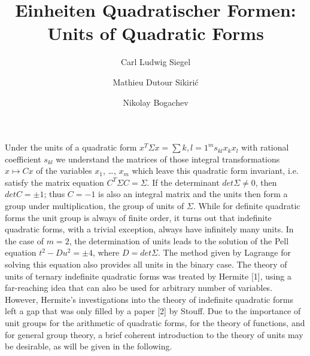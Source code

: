 \documentclass[10pt]{amsart}
\title{Einheiten Quadratischer Formen: Units of Quadratic Forms}
\begin{document}

\author[C.L. Siegel]{Carl Ludwig Siegel}

\author[M. D. Sikiri\'c]{Mathieu Dutour Sikiri\'c}
\address{Mathieu Dutour Sikiri\'c, Rudjer Boskovi\'c Institute, Bijeni\v{c}ka 54, 10000 Zagreb, Croatia}

\author[N. Bogachev]{Nikolay Bogachev}
\address{University of Toronto, Canada}


\newcommand{\RR}{\ensuremath{\mathbb{R}}}
\newcommand{\NN}{\ensuremath{\mathbb{N}}}
\newcommand{\QQ}{\ensuremath{\mathbb{Q}}}
\newcommand{\CC}{\ensuremath{\mathbb{C}}}
\newcommand{\ZZ}{\ensuremath{\mathbb{Z}}}
\newcommand{\TT}{\ensuremath{\mathbb{T}}}

\newtheorem{theorem}{Theorem}[section]
\newtheorem{proposition}[theorem]{Proposition}
\newtheorem{corollary}[theorem]{Corollary}
\newtheorem{lemma}[theorem]{Lemma}
\newtheorem{problem}[theorem]{Problem}
\newtheorem{conjecture}{Conjecture}
\newtheorem{question}{Question}
\newtheorem{claim}{Claim}
\newtheorem{remark}[theorem]{Remark}
\theoremstyle{definition}
\newtheorem{definition}[theorem]{Definition}

\maketitle

Under the units of a quadratic form $x^T \Sigma x = \sum{k,l=1}^m s_{kl} x_k x_l$ with
rational coefficient $s_{kl}$ we understand the matrices of those integral transformations
$x\mapsto Cx$ of the variables $x_1$, \dots, $x_m$ which leave this quadratic form invariant,
i.e. satisfy the matrix equation $C^T \Sigma C = \Sigma$.
If the determinant $det \Sigma \not= 0$, then
$det C = \pm 1$; thus $C = -1$ is also an integral matrix and the units then form a group
under multiplication, the group of units of $\Sigma$. While for definite quadratic forms
the unit group is always of finite order, it turns out that indefinite quadratic forms,
with a trivial exception, always have infinitely many units.
In the case of $m = 2$, the determination of units leads to the solution of the
Pell equation $t^2 - D u^2 = \pm 4$, where $D = det \Sigma$. The method given by Lagrange
for solving this equation also provides all units in the binary case. The theory
of units of ternary indefinite quadratic forms was treated by Hermite [1], using a
far-reaching idea that can also be used for arbitrary number of variables. However,
Hermite’s investigations into the theory of indefinite quadratic forms left a gap that
was only filled by a paper [2] by Stouff.
Due to the importance of unit groups for the arithmetic of quadratic forms, for
the theory of functions, and for general group theory, a brief coherent introduction
to the theory of units may be desirable, as will be given in the following.
\end{document}
